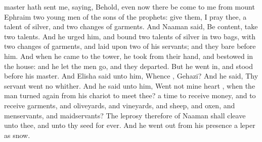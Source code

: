 {master hath
sent me,
saying, Behold, even now there be
come to me from
mount
Ephraim
two young
men of the
sons of the
prophets:
give them, I pray thee, a
talent of
silver, and
two
changes of
garments.
And
Naaman
said, Be
content,
take two
talents. And he
urged him, and
bound
two
talents of
silver in
two
bags, with
two
changes of
garments, and
laid
{} upon
two of his
servants; and they
bare
{}
before him.
And when he
came to the
tower, he
took
{} from their
hand, and
bestowed
{} in the
house: and he let the
men
go, and they
departed.
But he went
in, and
stood before his
master. And
Elisha
said unto him,
Whence
{},
Gehazi? And he
said, Thy
servant
went no
whither.
And he
said unto him,
Went not mine
heart
{}, when the
man
turned again from his
chariot to
meet thee?
{} a
time to
receive
money, and to
receive
garments, and
oliveyards, and
vineyards, and
sheep, and
oxen, and
menservants, and
maidservants?
The
leprosy therefore of
Naaman shall
cleave unto thee, and unto thy
seed for
ever. And he went
out from his
presence a
leper
{} as
snow.

}
